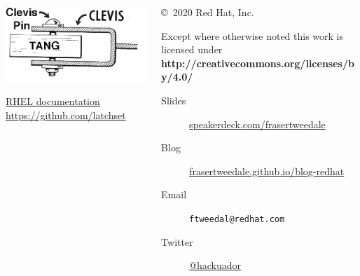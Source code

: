 \documentclass[ignorenonframetext,aspectratio=169]{beamer}
\begin{document}
\begin{frame}[plain]
\begin{columns}

  \begin{column}{.4\textwidth}
    \includegraphics[width=1.2\textwidth]{clevis.jpg}

\begin{center}
\href{https://access.redhat.com/documentation/en-us/red_hat_enterprise_linux/8/html/security_hardening/configuring-automated-unlocking-of-encrypted-volumes-using-policy-based-decryption_security-hardening}{RHEL documentation}
\\
\smallskip
\url{https://github.com/latchset}
\end{center}

  \end{column}

  \begin{column}{.6\textwidth}

    \setlength{\parskip}{.5em}

    { \centering

    

    \copyright~2020  Red Hat, Inc.

    { \scriptsize
    Except where otherwise noted this work is licensed under
    }
    { \footnotesize
    \textbf{http://creativecommons.org/licenses/by/4.0/}
    }

    }

    \begin{description}
      \item[Slides] \href{https://speakerdeck.com/frasertweedale}{speakerdeck.com/frasertweedale}
      \item[Blog] \href{https://frasertweedale.github.io/blog-redhat/}{frasertweedale.github.io/blog-redhat}
      \item[Email] \texttt{ftweedal@redhat.com}
      \item[Twitter] \href{https://twitter.com/hackuador}{@hackuador}
    \end{description}
  \end{column}

\end{columns}
\end{frame}
\end{document}
